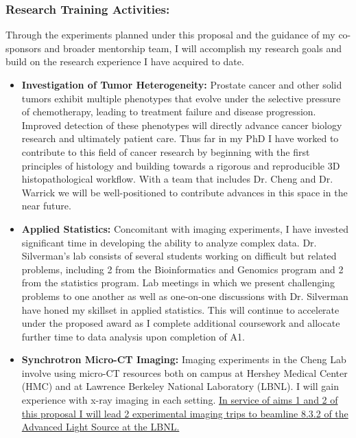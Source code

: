 \documentclass{NIHGrant}
\begin{document}
\subsubsection*{Research Training Activities:}
Through the experiments planned under this proposal and the guidance of my co-sponsors and broader mentorship team, I will accomplish my research goals and build on the research experience I have acquired to date.
\begin{itemize}[leftmargin=*, nosep]
  \item \textbf{Investigation of Tumor Heterogeneity:} Prostate cancer and other solid tumors exhibit multiple phenotypes that evolve under the selective pressure of chemotherapy, leading to treatment failure and disease progression. Improved detection of these phenotypes will directly advance cancer biology research and ultimately patient care. Thus far in my PhD I have worked to contribute to this field of cancer research by beginning with the first principles of histology and building towards a rigorous and reproducible 3D histopathological workflow. With a team that includes Dr. Cheng and Dr. Warrick we will be well-positioned to contribute advances in this space in the near future.
  \item \textbf{Applied Statistics:} Concomitant with imaging experiments, I have invested significant time in developing the ability to analyze complex data. Dr. Silverman's lab consists of several students working on difficult but related problems, including 2 from the Bioinformatics and Genomics program and 2 from the statistics program. Lab meetings in which we present challenging problems to one another as well as one-on-one discussions with Dr. Silverman have honed my skillset in applied statistics. This will continue to accelerate under the proposed award as I complete additional coursework and allocate further time to data analysis upon completion of A1.
  \item \textbf{Synchrotron Micro-CT Imaging:} Imaging experiments in the Cheng Lab involve using micro-CT resources both on campus at Hershey Medical Center (HMC) and at Lawrence Berkeley National Laboratory (LBNL). I will gain experience with x-ray imaging in each setting. \uline{In service of aims 1 and 2 of this proposal I will lead 2 experimental imaging trips to beamline 8.3.2 of the Advanced Light Source at the LBNL.} %

\end{itemize}
\end{document}
